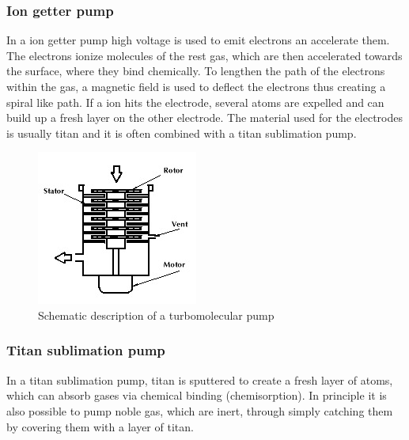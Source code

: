\documentclass[a4paper]{scrartcl}
\numberwithin{equation}{section}
\numberwithin{figure}{section}
\numberwithin{table}{section}
\begin{document}
\clearpage
\subsubsection{Ion getter pump}
In a ion getter pump high voltage is used to emit electrons an accelerate them. The electrons ionize molecules of the rest gas, which are then accelerated towards the surface, where they bind chemically. To lengthen the path of the electrons within the gas, a magnetic field is used to deflect the electrons thus creating a spiral like path. If a ion hits the electrode, several atoms are expelled and can build up a fresh layer on the other electrode. The material used for the electrodes is usually titan and it is often combined with a titan sublimation pump.
\begin{figure}
  \centering
  
   	\includegraphics[width=0.9\linewidth]{pic/tu.jpg}

 \caption{\small Schematic description of a turbomolecular pump}
        \label{fig:turbo}
\end{figure}

\subsubsection{Titan sublimation pump}
In a titan sublimation pump, titan is sputtered to create a fresh layer of atoms, which can absorb gases via chemical binding (chemisorption). In principle it is also possible to pump noble gas, which are inert, through simply catching them by covering them with a layer of titan. 
\end{document}
